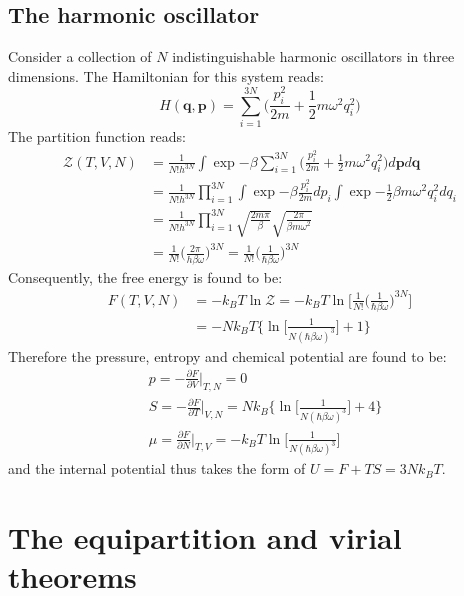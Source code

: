 \documentclass[a4paper,11pt,oneside]{book}
\begin{document}
\subsection{The harmonic oscillator}
Consider a collection of $N$ indistinguishable harmonic oscillators in three dimensions. The Hamiltonian for this system reads:
\begin{equation}
    H(\textbf{q},\textbf{p}) = \sum_{i=1}^{3N} \bigg(\frac{{p}_i^2}{2m} + \frac{1}{2}m\omega^2{q}_i^2\bigg)
\end{equation}
The partition function reads:
\begin{align}
    \mathcal{Z}(T,V,N) &= \frac{1}{N! h^{3N}} \int \exp{-\beta \sum_{i=1}^{3N}\bigg(\frac{{p}_i^2}{2m} + \frac{1}{2}m\omega^2{q}_i^2\bigg)} d\textbf{p}d\textbf{q}\\
    &=\frac{1}{N! h^{3N}} \prod_{i=1}^{3N} \int \exp{-\beta \frac{{p}_i^2}{2m}} dp_i\int \exp{-\frac{1}{2}\beta m\omega^2{q}_i^2} dq_i\\
    &=\frac{1}{N! h^{3N}} \prod_{i=1}^{3N} \sqrt{\frac{2m \pi}{\beta}} \sqrt{\frac{2\pi}{\beta m \omega^2}}\\
    &= \frac{1}{N!} \bigg(\frac{2\pi}{h\beta \omega}\bigg)^{3N}=\frac{1}{N!} \bigg(\frac{1}{\hbar \beta \omega}\bigg)^{3N}
\end{align}
Consequently, the free energy is found to be:
\begin{align}
    F(T,V,N) &= -k_B T \ln \mathcal{Z} = -k_B T \ln \bigg[\frac{1}{N!} \bigg(\frac{1}{\hbar \beta \omega}\bigg)^{3N}\bigg]\\
    &=-Nk_B T\bigg\{\ln \bigg[\frac{1}{N(\hbar \beta \omega)^3}\bigg]+1\bigg\}
\end{align}
Therefore the pressure, entropy and chemical potential are found to be:
\begin{align}
    &p = - \frac{\partial F}{\partial V}\bigg|_{T,N} = 0\\
    &S = - \frac{\partial F}{\partial T}\bigg|_{V,N} = Nk_B\bigg\{\ln \bigg[\frac{1}{N(\hbar \beta \omega)^3}\bigg]+4\bigg\}\\
    &\mu = \frac{\partial F}{\partial N}\bigg|_{T,V} = -k_B T \ln \bigg[\frac{1}{N(\hbar \beta \omega)^3}\bigg]
\end{align}
and the internal potential thus takes the form of $U = F+TS=3Nk_BT$. 

\section{The equipartition and virial theorems}
\end{document}
